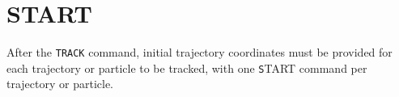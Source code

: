 
          

\section{START}          
\label{sec:start}

After the \texttt{TRACK} command, initial trajectory coordinates must be
provided for each trajectory or particle to be tracked, with one
{\texttt START} command per trajectory or particle.

